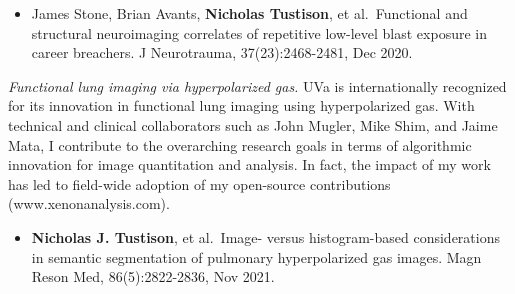 \documentclass[
  11pt,
]{article}
\providecommand{\tightlist}{%
  \setlength{\itemsep}{0pt}\setlength{\parskip}{0pt}}
\begin{document}
\begin{itemize}
\tightlist
\item
  James Stone, Brian Avants, \textbf{Nicholas Tustison}, et
  al.~Functional and structural neuroimaging correlates of repetitive
  low-level blast exposure in career breachers. J Neurotrauma,
  37(23):2468-2481, Dec 2020.
\end{itemize}

\emph{Functional lung imaging via hyperpolarized gas.} UVa is
internationally recognized for its innovation in functional lung imaging
using hyperpolarized gas. With technical and clinical collaborators such
as John Mugler, Mike Shim, and Jaime Mata, I contribute to the
overarching research goals in terms of algorithmic innovation for image
quantitation and analysis. In fact, the impact of my work has led to
field-wide adoption of my open-source contributions
(www.xenonanalysis.com).

\begin{itemize}
\tightlist
\item
  \textbf{Nicholas J. Tustison}, et al.~Image- versus histogram-based
  considerations in semantic segmentation of pulmonary hyperpolarized
  gas images. Magn Reson Med, 86(5):2822-2836, Nov 2021.
\end{itemize}
\end{document}
